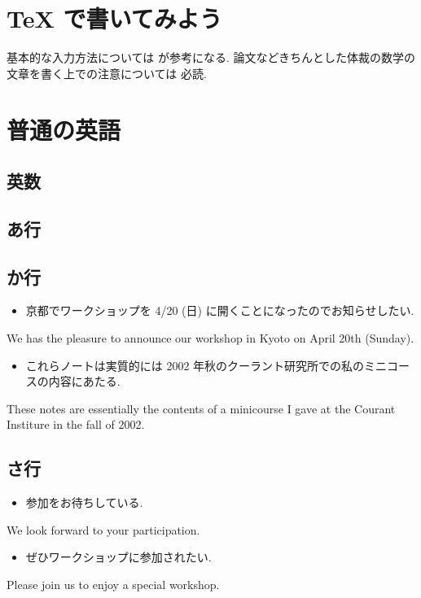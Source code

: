 \documentclass[openany, a4paper, oneside]{jsbook}
\begin{document}
\chapter{\TeX{} で書いてみよう}

基本的な入力方法については \cite{TakashiSakai1} が参考になる.
論文などきちんとした体裁の数学の文章を書く上での注意については \cite{TadaoOda1} 必読.
\chapter{普通の英語}

\section{英数}

\section{あ行}

\section{か行}

\begin{itemize}
\item 京都でワークショップを 4/20 (日) に開くことになったのでお知らせしたい.
\end{itemize}
We has the pleasure to announce our workshop in Kyoto on April 20th (Sunday).

\begin{itemize}
\item これらノートは実質的には 2002 年秋のクーラント研究所での私のミニコースの内容にあたる. \cite{VSVaradarajan1}
\end{itemize}
These notes are essentially the contents of a minicourse I gave
at the Courant Institure in the fall of 2002.
\section{さ行}

\begin{itemize}
\item 参加をお待ちしている.
\end{itemize}
We look forward to your participation.

\begin{itemize}
\item ぜひワークショップに参加されたい.
\end{itemize}
Please join us to enjoy a special workshop.
\end{document}
